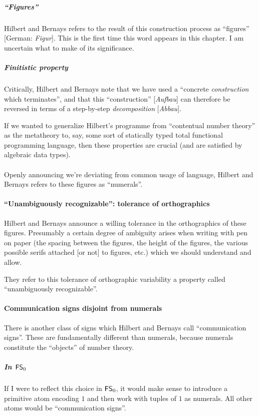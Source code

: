 \subparagraph{``Figures''}
Hilbert and Bernays refers to the result of this construction process
as ``figures'' [German: \textit{Figur\/}]. This is the first time this
word appears in this chapter. I am uncertain what to make of its
significance. 

\subparagraph{Finitistic property}
Critically, Hilbert and Bernays note that we have used a ``concrete
\emph{construction} which terminates'', and that this ``construction''
[\textit{Aufbau\/}] can therefore be reversed in terms of a
step-by-step \emph{decomposition} [\textit{Abbau\/}].

If we wanted to generalize Hilbert's programme from ``contentual
number theory'' as the metatheory to, say, some sort of statically
typed total functional programming language, then these properties are
crucial (and are satisfied by algebraic data types).

\paragraph{} %
Openly announcing we're deviating from common usage of language,
Hilbert and Bernays refers to these figures as ``numerals''.

\paragraph{``Unambiguously recognizable'': tolerance of orthographics} %
Hilbert and Bernays announce a willing tolerance in the orthographics
of these figures. Presumably a certain degree of ambiguity arises when
writing with pen on paper (the spacing between the figures, the height
of the figures, the various possible serifs attached [or not] to
figures, etc.) which we should understand and allow.

They refer to this tolerance of orthographic variability a property
called ``unambiguously recognizable''.

\paragraph{Communication signs disjoint from numerals} %
There is another class of signs which Hilbert and Bernays call
``communication signs''. These are fundamentally different than
numerals, because numerals constitute the ``objects'' of number theory.

\subparagraph{In $\FS0/$}
If I were to reflect this choice in $\FS0/$, it would make sense to
introduce a primitive atom encoding $1$ and then work with
tuples of $1$ as numerals. All other atoms would be ``communication signs''.

